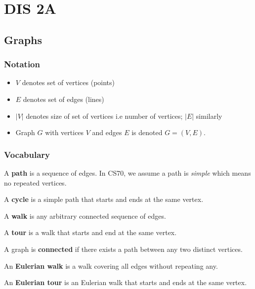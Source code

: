 \section{DIS 2A}
\subsection{Graphs}

\subsubsection{Notation}
\begin{itemize}
    \item $V$ denotes set of vertices (points)
    \item $E$ denotes set of edges (lines)
    \item $|V|$ denotes size of set of vertices i.e number of vertices; $|E|$ similarly
    \item Graph $G$ with vertices $V$ and edges $E$ is denoted $G = (V,E)$. 
\end{itemize}

\subsubsection{Vocabulary}

\begin{definition}[Path]
    A \textbf{path} is a sequence of edges. In CS70, we assume a path is \textit{simple} which means no repeated vertices. 
\end{definition}
\begin{definition}[Cycle]
    A \textbf{cycle} is a simple path that starts and ends at the same vertex. 
\end{definition}
\begin{definition}[Walk]
    A \textbf{walk} is any arbitrary connected sequence of edges. 
\end{definition}
\begin{definition}[Tour]
    A \textbf{tour} is a walk that starts and end at the same vertex. 
\end{definition}
\begin{definition}[Connected]
    A graph is \textbf{connected} if there exists a path between any two distinct vertices. 
\end{definition}
\begin{definition}
    An \textbf{Eulerian walk} is a walk covering all edges without repeating any. 
\end{definition}
\begin{definition}
    An \textbf{Eulerian tour} is an Eulerian walk that starts and ends at the same vertex. 
\end{definition}

